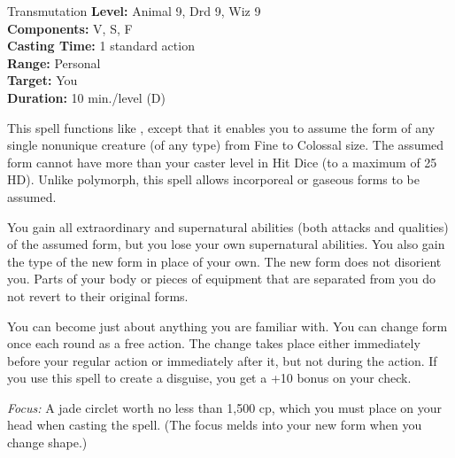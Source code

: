 {Transmutation}
{
	\textbf{Level:}
	Animal 9, Drd 9, Wiz 9\\
	\textbf{Components:}
	V, S, F\\
	\textbf{Casting Time:}
	1 standard action\\
	\textbf{Range:}
	Personal\\
	\textbf{Target:}
	You\\
	\textbf{Duration:}
	10 min./level (D)\\
}
{
	This spell functions like , except that it enables you to assume the form of any single nonunique creature (of any type) from Fine to Colossal size. The assumed form cannot have more than your caster level in Hit Dice (to a maximum of 25 HD). Unlike polymorph, this spell allows incorporeal or gaseous forms to be assumed.

	You gain all extraordinary and supernatural abilities (both attacks and qualities) of the assumed form, but you lose your own supernatural abilities. You also gain the type of the new form in place of your own. The new form does not disorient you. Parts of your body or pieces of equipment that are separated from you do not revert to their original forms.

	You can become just about anything you are familiar with. You can change form once each round as a free action. The change takes place either immediately before your regular action or immediately after it, but not during the action. If you use this spell to create a disguise, you get a +10 bonus on your  check.

	\textit{Focus:}
	A jade circlet worth no less than 1,500 cp, which you must place on your head when casting the spell. (The focus melds into your new form when you change shape.)

}

